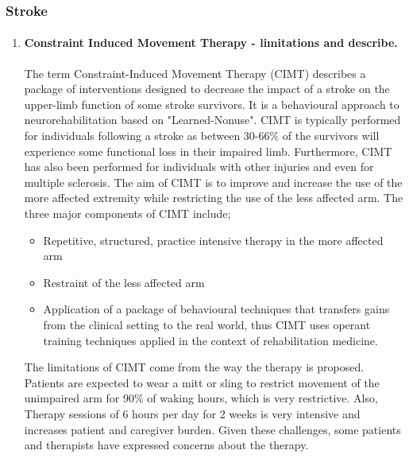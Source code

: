 \documentclass[12pt,article,oneside,a4paper]{memoir}
\begin{document}
\subsubsection{Stroke}
\begin{enumerate}
\item \paragraph{Constraint Induced Movement Therapy - limitations and
describe.}

The term Constraint-Induced Movement Therapy (CIMT) describes a package of
interventions designed to decrease the impact of a stroke on the upper-limb
function of some stroke survivors. It is a behavioural approach to
neurorehabilitation based on "Learned-Nonuse".
CIMT is typically performed for individuals following a stroke as between
30-66\% of the survivors will experience some functional loss in their impaired
limb. Furthermore, CIMT has also been performed for individuals with other
injuries and even for multiple sclerosis. The aim of CIMT is to improve and
increase the use of the more affected extremity while restricting the use of
the less affected arm.
The three major components of CIMT include;
\begin{itemize}
\item Repetitive, structured, practice intensive therapy in the more affected
arm
\item Restraint of the less affected arm
\item Application of a package of behavioural techniques that transfers gains
from the clinical setting to the real world, thus CIMT uses operant training
techniques applied in the context of rehabilitation medicine.
\end{itemize}

The limitations of CIMT come from the way the therapy is proposed. Patients
are expected to wear a mitt or sling to restrict movement of the unimpaired arm
for 90\% of waking hours, which is very restrictive. Also, Therapy sessions of
6 hours per day for 2 weeks is very intensive and increases patient and
caregiver burden. Given these challenges, some patients and therapists have
expressed concerns about the therapy.

\end{enumerate}

\end{document}
